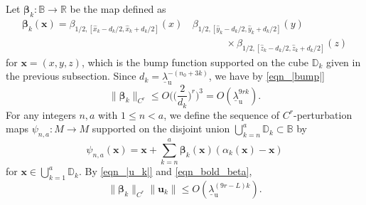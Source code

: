 \documentclass{amsart}
\theoremstyle{definition}
\numberwithin{equation}{section}
\numberwithin{figure}{section}
\begin{document}
Let $\boldsymbol{\beta}_k:\mathbb{B}\longrightarrow\mathbb{R}$ be the map defined as
\begin{align*}
\boldsymbol{\beta}_k(\boldsymbol{x})=\beta_{1/2,[\widehat x_k-d_k/2,\widehat x_k+d_k/2]}(x)\,&\beta_{1/2,[\widehat y_k-d_k/2,\widehat y_k+d_k/2]}(y)\,\\
&\hspace{40pt}\times \beta_{1/2,[\widehat z_k-d_k/2,\widehat z_k+d_k/2]}(z)
\end{align*}
for $\boldsymbol{x}=(x,y,z)$, which is the bump function supported on the cube $\mathbb{D}_k$ given in the previous subsection.
Since $d_k=\underline{\lambda}_{\mathrm{u}}^{-(n_0+3k)}$, we have 
by \eqref{eqn_|bump|}   
\begin{equation}\label{eqn_bold_beta}
\|\boldsymbol{\beta}_k\|_{C^r}\leq O\biggl(\biggl(\frac2{d_k}\biggr)^r\biggr)^3=O(\underline{\lambda}_{\mathrm{u}}^{9rk}).
\end{equation}
For any integers $n,a$ with $1\leq n<a$,
we define the sequence of $C^r$-perturbation maps $\psi_{n,a}:M\longrightarrow M$ supported on the disjoint union 
$\bigcup_{k=n}^a\mathbb{D}_k\subset \mathbb{B}$ by
$$\psi_{n,a}(\boldsymbol{x})=\boldsymbol{x}+\sum_{k=n}^a\boldsymbol{\beta}_k(\boldsymbol{x})(\alpha_k(\boldsymbol{x})-\boldsymbol{x})$$
for $\boldsymbol{x}\in \bigcup_{k=1}^a\mathbb{D}_k$.
By \eqref{eqn_|u_k|} and \eqref{eqn_bold_beta},   
\begin{equation}\label{eqn_|beta_u|}
\|\boldsymbol{\beta}_k\|_{C^r}\|\boldsymbol{u}_k\|\leq O(\underline{\lambda}_{\mathrm{u}}^{(9r-L)k}).
\end{equation}
\end{document}
